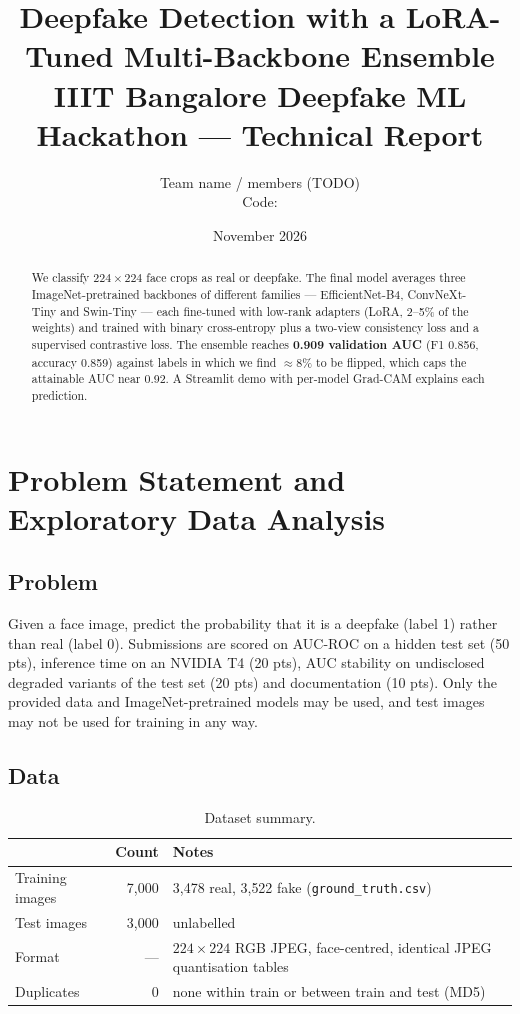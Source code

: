 \documentclass[11pt,a4paper]{article}
\title{\textbf{Deepfake Detection with a LoRA-Tuned Multi-Backbone Ensemble}\\[4pt]
\large IIIT Bangalore Deepfake ML Hackathon --- Technical Report}
\author{Team name / members (TODO)\\[2pt]
\small Code: \href{\githuburl}{\texttt{\githuburl}}}
\date{November 2026}
\begin{document}
\maketitle

\begin{abstract}
\noindent We classify $224\times224$ face crops as real or deepfake. The final model averages three ImageNet-pretrained backbones of different families --- EfficientNet-B4, ConvNeXt-Tiny and Swin-Tiny --- each fine-tuned with low-rank adapters (LoRA, 2--5\% of the weights) and trained with binary cross-entropy plus a two-view consistency loss and a supervised contrastive loss. The ensemble reaches \textbf{0.909 validation AUC} (F1 0.856, accuracy 0.859) against labels in which we find $\approx$8\% to be flipped, which caps the attainable AUC near 0.92. A Streamlit demo with per-model Grad-CAM explains each prediction.
\end{abstract}

\section{Problem Statement and Exploratory Data Analysis}

\subsection{Problem}
Given a face image, predict the probability that it is a deepfake (label 1) rather than real (label 0). Submissions are scored on AUC-ROC on a hidden test set (50 pts), inference time on an NVIDIA T4 (20 pts), AUC stability on undisclosed degraded variants of the test set (20 pts) and documentation (10 pts). Only the provided data and ImageNet-pretrained models may be used, and test images may not be used for training in any way.

\subsection{Data}
\begin{table}[H]
\centering\small
\begin{tabular}{@{}lrl@{}}
\toprule
 & Count & Notes \\
\midrule
Training images & 7{,}000 & 3{,}478 real, 3{,}522 fake (\texttt{ground\_truth.csv}) \\
Test images & 3{,}000 & unlabelled \\
Format & --- & $224\times224$ RGB JPEG, face-centred, identical JPEG quantisation tables \\
Duplicates & 0 & none within train or between train and test (MD5) \\
\bottomrule
\end{tabular}
\caption{Dataset summary.}
\end{table}
\end{document}
